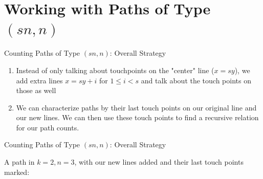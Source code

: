 \documentclass{beamer}
\begin{document}
\section{Working with Paths of Type $(sn,n)$}
\begin{frame}{Counting Paths of Type $(sn,n)$: Overall Strategy}
    \newline

    \pause

    \begin{enumerate}[<+->]
        \item Instead of only talking about touchpoints on the "center" line ($x = sy$), we add extra lines $x = sy + i$ for $1 \leq i < s$ and talk about the touch points on those as well
        \item We can characterize paths by their last touch points on our original line and our new lines. We can then use these touch points to find a recursive relation for our path counts.
    \end{enumerate}
\end{frame}

\begin{frame}{Counting Paths of Type $(sn,n)$: Overall Strategy}
    \begin{example} A path in $k = 2, n = 3$, with our new lines added and their last touch points marked:
    \begin{center}
    \end{center}
    \end{example}
\end{frame}
\end{document}

